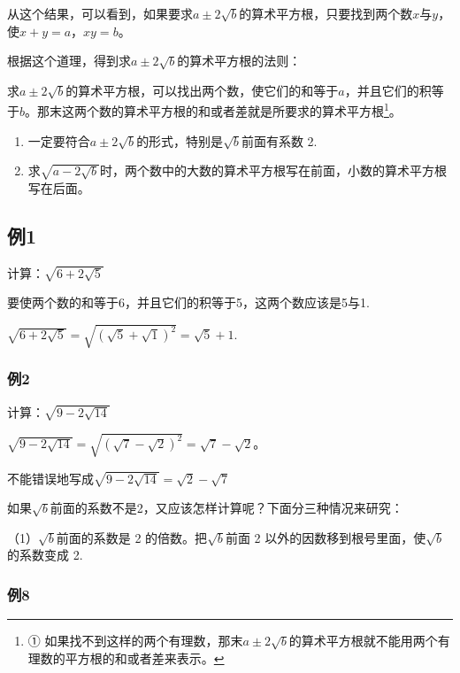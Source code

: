 从这个结果，可以看到，如果要求\(a \pm 2\sqrt{b}\)的算术平方根，只要找到两个数\(x\)与\(y\)，使\(x + y = a\)，\(xy = b\)。

根据这个道理，得到求\(a \pm 2\sqrt{b}\)的算术平方根的法则：

求\(a \pm 2\sqrt{b}\)的算术平方根，可以找出两个数，使它们的和等于\(a\)，并且它们的积等于\(b\)。那末这两个数的算术平方根的和或者差就是所要求的算术平方根\footnote{①
  如果找不到这样的两个有理数，那末\(a \pm 2\sqrt{b}\)的算术平方根就不能用两个有理数的平方根的和或者差来表示。}。


\begin{enumerate}
\item
  一定要符合\(a \pm 2\sqrt{b}\)的形式，特别是\(\sqrt{b}\)前面有系数 2.
\item
  求\(\sqrt{a - 2\sqrt{b}}\)时，两个数中的大数的算术平方根写在前面，小数的算术平方根写在后面。
\end{enumerate}

\subsection{例1}

计算：\(\sqrt{6 + 2\sqrt{5}}\)

要使两个数的和等于6，并且它们的积等于5，这两个数应该是5与1.

\(\sqrt{6 + 2\sqrt{5}} = \sqrt{(\sqrt{5} + \sqrt{1})^2} = \sqrt{5} + 1.\)

\subsubsection{例2}

计算：\(\sqrt{9 - 2\sqrt{14}}\)

\(\sqrt{9 - 2\sqrt{14}} = \sqrt{(\sqrt{7} - \sqrt{2})^2} = \sqrt{7} - \sqrt{2}\)。

不能错误地写成\(\sqrt{9 - 2\sqrt{14}} = \sqrt{2} -\sqrt{7}\)

如果\(\sqrt{b}\)前面的系数不是2，又应该怎样计算呢？下面分三种情况来研究：

（1）\(\sqrt{b}\)前面的系数是 2 的倍数。把\(\sqrt{b}\)前面 2
以外的因数移到根号里面，使\(\sqrt{b}\)的系数变成 2.

\subsubsection{例8}

